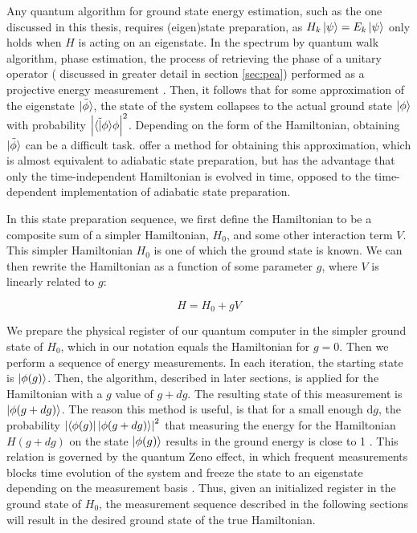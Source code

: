 Any quantum algorithm for ground state energy estimation, such as the one discussed in this thesis, requires (eigen)state preparation, as $H_k \left\vert{\psi}\right\rangle = E_k \left\vert{\psi}\right\rangle$ only holds when $H$ is acting on an eigenstate. In the spectrum by quantum walk algorithm, phase estimation, the process of retrieving the phase of a unitary operator ( discussed in greater detail in section \ref{sec:pea}) performed as a projective energy measurement \cite{poulin}. Then, it follows that for some approximation of the eigenstate $\tilde{\left\vert{\phi}\right\rangle}$, the state of the system collapses to the actual ground state $\left\vert{\phi}\right\rangle$ with probability $\abs{\langle \tilde | \phi \rangle \phi }^2$. Depending on the form of the Hamiltonian, obtaining $\tilde{\left\vert{\phi}\right\rangle}$
 can be a difficult task. \textcite{poulin} offer a method for obtaining this approximation, which is almost equivalent to adiabatic state preparation, but has the advantage that only the time-independent Hamiltonian is evolved in time, opposed to the time-dependent implementation of adiabatic state preparation.

In this state preparation sequence, we first define the Hamiltonian to be a composite sum of a simpler Hamiltonian, $H_0$, and some other interaction term $V$. This simpler Hamiltonian $H_0$ is one of which the ground state is known. We can then rewrite the Hamiltonian as a function of some parameter $g$, where $V$ is linearly related to $g$:

$$
H= H_0 + gV
$$

We prepare the physical register of our quantum computer in the simpler ground state of $H_0$, which in our notation equals the Hamiltonian for $g = 0$. Then we perform a sequence of energy measurements. In each iteration, the starting state is $\left\vert{\phi(g)}\right\rangle$. Then, the algorithm, described in later sections, is applied for the Hamiltonian with a $g$ value of $g + dg$. The resulting state of this measurement is $\left\vert{\phi(g+dg)}\right\rangle$.   The reason this method is useful, is that for a small enough $\text{d}g$, the probability $\abs{\left\langle{\phi(g)}\right\vert\left\vert{\phi(g+dg)}\right\rangle}^2$ that measuring the energy  for the Hamiltonian $H(g + dg)$ on the state $\left\vert{\phi(g)}\right\rangle$ results in the ground energy is close to 1 \cite{poulin}. This relation is governed by the quantum Zeno effect, in which frequent measurements blocks time evolution of the system and freeze the state to an eigenstate depending on the measurement basis \cite{zeno}. Thus, given an initialized register in the ground state of
$H_0$, the measurement sequence described in the following sections will result in the desired ground state of the true Hamiltonian.
